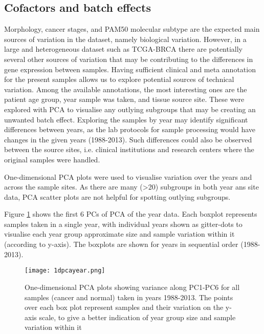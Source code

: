     
 
    
    \newpage
    \subsection{Cofactors and batch effects}
    
    Morphology, cancer stages, and PAM50 molecular subtype are the expected main sources of variation in the dataset, namely biological variation. However, in a large and heterogeneous dataset such as TCGA-BRCA there are potentially several other sources of variation that may be contributing to the differences in gene expression between samples. Having sufficient clinical and meta annotation for the present samples allows us to explore potential sources of technical variation.
    Among the available annotations, the most interesting ones are the patient age group, year sample was taken, and tissue source site. These were explored with PCA to visualise any outlying subgroups that may be creating an unwanted batch effect.
    Exploring the samples by year may identify significant differences between years, as the lab protocols for sample processing would have changes in the given years (1988-2013). Such differences could also be observed between the source sites, i.e. clinical institutions and research centers where the original samples were handled. 

    One-dimensional PCA plots were used to visualise variation over the years and across the sample sites. As there are many (>20) subgroups in both year ans site data, PCA scatter plots are not helpful for spotting outlying subgroups. 
    
    Figure \ref{fig:1dpcayear} shows the first 6 PCs of PCA of the year data. Each boxplot represents samples taken in a single year, with individual years shown as gitter-dots to visualise each year group approximate size and sample variation within it (according to y-axis). The boxplots are shown for years in sequential order (1988-2013). 
        
            \begin{figure}[!h]
            \centering
            \texttt{[image: 1dpcayear.png]}
            \caption{One-dimensional PCA plots showing variance along PC1-PC6 for all samples (cancer and normal) taken in years 1988-2013. The points over each box plot represent samples and their variation on the y-axis scale, to give a better indication of year group size and sample variation within it}
            \label{fig:1dpcayear}
            \end{figure}
    
